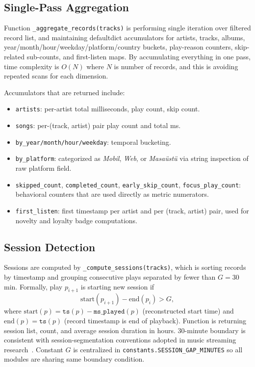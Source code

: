 \documentclass[conference]{IEEEtran}
\begin{document}
\subsection{Single-Pass Aggregation}

Function \texttt{\_aggregate\_records(tracks)} is performing single iteration over filtered record list, and maintaining defaultdict accumulators for artists, tracks, albums, year/month/hour/weekday/platform/country buckets, play-reason counters, skip-related sub-counts, and first-listen maps. By accumulating everything in one pass, time complexity is $O(N)$ where $N$ is number of records, and this is avoiding repeated scans for each dimension.

Accumulators that are returned include:
\begin{itemize}
  \item \texttt{artists}: per-artist total milliseconds, play count, skip count.
  \item \texttt{songs}: per-(track, artist) pair play count and total ms.
  \item \texttt{by\_year/month/hour/weekday}: temporal bucketing.
  \item \texttt{by\_platform}: categorized as \textit{Mobil}, \textit{Web},
        or \textit{Masaüstü} via string inspection of raw platform field.
  \item \texttt{skipped\_count}, \texttt{completed\_count},
        \texttt{early\_skip\_count}, \texttt{focus\_play\_count}: behavioral
        counters that are used directly as metric numerators.
  \item \texttt{first\_listen}: first timestamp per artist and per
        (track, artist) pair, used for novelty and loyalty badge computations.
\end{itemize}

\subsection{Session Detection}

Sessions are computed by \texttt{\_compute\_sessions(tracks)}, which is sorting records by timestamp and grouping consecutive plays separated by fewer than $G = 30$\,min. Formally, play $p_{i+1}$ is starting new session if
\begin{equation}
  \mathrm{start}(p_{i+1}) - \mathrm{end}(p_i) > G,
\end{equation}
where $\mathrm{start}(p) = \texttt{ts}(p) - \texttt{ms\_played}(p)$ (reconstructed start time) and $\mathrm{end}(p) = \texttt{ts}(p)$ (record timestamp is end of playback). Function is returning session list, count, and average session duration in hours. 30-minute boundary is consistent with session-segmentation conventions adopted in music streaming research~\cite{brost2019sessions}. Constant $G$ is centralized in \texttt{constants.SESSION\_GAP\_MINUTES} so all modules are sharing same boundary condition.
\end{document}
